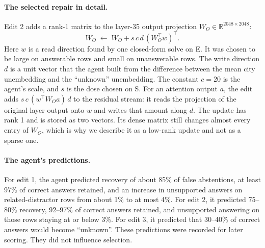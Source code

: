 \paragraph{The selected repair in detail.}
Edit 2 adds a rank-1 matrix to the layer-35 output projection $W_O \in \mathbb{R}^{2048 \times 2048}$:
\[
  W_O \;\leftarrow\; W_O + s \, c \, d\,(W_O^{\top} w)^{\top}.
\]
Here $w$ is a read direction found by one closed-form solve on E. It was chosen to be large on answerable rows and
small on unanswerable rows. The write direction $d$ is a unit vector that the agent built from the difference between the
mean city unembedding and the ``unknown'' unembedding. The constant $c = 20$ is the agent's scale, and $s$ is the dose chosen on S. For an attention output
$a$, the edit adds $s\,c\,(w^{\top} W_O a)\,d$ to the residual stream: it reads the projection of the original
layer output onto $w$ and writes that amount along $d$. The update has rank 1 and is stored as two vectors. Its
dense matrix still changes almost every entry of $W_O$, which is why we describe it as a low-rank update and not as
a sparse one.

\paragraph{The agent's predictions.}
For edit 1, the agent predicted recovery of about 85\% of false abstentions, at least 97\% of correct answers
retained, and an increase in unsupported answers on related-distractor rows from about 1\% to at most 4\%. For
edit 2, it predicted 75--80\% recovery, 92--97\% of correct answers retained, and unsupported answering on those rows
staying at or below 3\%. For edit 3, it predicted that 30--40\% of correct answers would become ``unknown''. These
predictions were recorded for later scoring. They did not influence selection.
